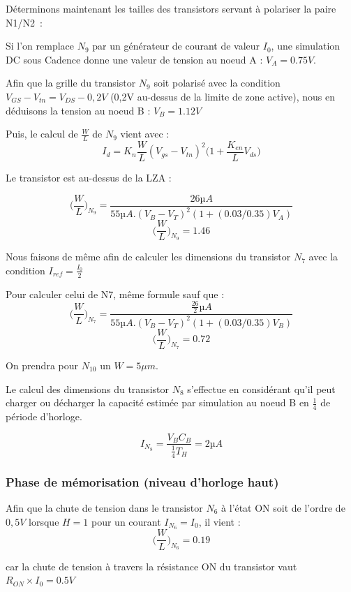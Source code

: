 \documentclass[11pt]{article}
\begin{document}
D\'eterminons maintenant les tailles des transistors servant \`a polariser la paire N1/N2 :

Si l'on remplace $N_{9}$ par un g\'en\'erateur de courant de valeur $I_{0}$, une simulation DC
sous Cadence donne une valeur de tension au noeud A : $V_A = 0.75 V$.

Afin que la grille du transistor $N_9$ soit polaris\'e avec la condition $V_{GS}-V_{tn}=V_{DS} - 0,2V$
 (0,2V au-dessus de la limite de zone active), nous en d\'eduisons la tension au noeud B : $V_B = 1.12 V$

Puis, le calcul de $\frac{W}{L}$ de $N_9$ vient avec :
\[
  I_d = K_n \frac{W}{L} (V_{gs} - V_{tn})^2 \bigg( 1 + \frac{K_{en}}{L} V_{ds}\bigg)
\]

Le transistor est au-dessus de la LZA :

\[
\bigg(\frac{W}{L} \bigg)_{N_9} = \frac {26µA}{55µA . (V_B - V_T)^2 ( 1+ (0.03/0.35) V_A)}
\]
\[
\bigg(\frac{W}{L} \bigg)_{N_9} = 1.46
\]

Nous faisons de m\^eme afin de calculer les dimensions du transistor $N_7$ avec la condition
$I_{ref} =\frac{I_0}{2}$

Pour calculer celui de N7, m\^eme formule sauf que :
\[
  \bigg(\frac{W}{L} \bigg)_{N_7} = \frac {\frac{26}{2}µA  }{55µA . (V_B - V_T)^2 ( 1+ (0.03/0.35) V_B)}
\]
\[
\bigg(\frac{W}{L} \bigg)_{N_7} = 0.72
\]

On prendra pour $N_{10}$ un $W = 5 \mu m$.

Le calcul des dimensions du transistor $N_8$ s'effectue en consid\'erant qu'il peut charger ou d\'echarger
la capacit\'e estim\'ee par simulation au noeud B en $\frac{1}{4}$ de p\'eriode d'horloge.

\[
I_{N_8} = \frac {V_B C_B}{\frac{1}{4} T_H} = 2 µA
\]

\subsubsection{Phase de m\'emorisation (niveau d'horloge haut)}

Afin que la chute de tension dans le transistor $N_6$  \`a l'\'etat ON soit de l'ordre de $0,5 V$ lorsque $H=1$
pour un courant $I_{N_6}= I_0$, il vient :
\[
  \bigg(\frac{W}{L} \bigg)_{N_6} = 0.19
\]

car la chute de tension \`a travers la r\'esistance ON du transistor vaut $R_{ON} \times I_0 = 0.5V$
\end{document}
